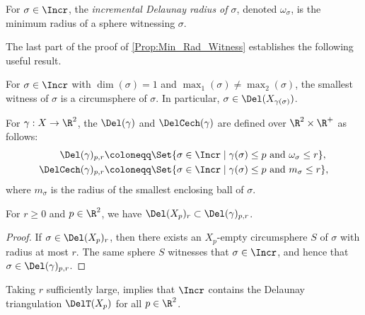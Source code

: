 %
\begin{definition}
For $\sigma\in \Incr$, the \emph{incremental Delaunay radius of $\sigma$},  denoted $\omega_\sigma$, is the minimum radius of a sphere witnessing $\sigma$. 
 \end{definition}
%
The last part of the proof of \cref{Prop:Min_Rad_Witness} establishes the following useful result.
%
\begin{proposition}\label{Prop:Empty_Tau_Delaunay}
For $\sigma\in \Incr$ with $\dim(\sigma)=1$ and $\max_1(\sigma)\ne \max_2(\sigma)$, the smallest witness of $\sigma$ is a circumsphere of $\sigma$.  In particular, $\sigma\in \Del(X_{\gamma(\sigma)})$.  
\end{proposition}
%
%
\begin{definition}
For $\gamma: X\to \R^2$, the  $\Del(\gamma)$ and  $\DelCech(\gamma)$ are defined over $\R^{2}\times\R^+$ as follows:
\begin{align*}
    \Del(\gamma)_{p, r} & \coloneqq \Set{\sigma\in\Incr \mid  \gamma(\sigma)\leq p\text{ and }  \omega_\sigma \leq r}, \\
    \DelCech(\gamma)_{p, r} & \coloneqq \Set{\sigma\in\Incr  \mid  \gamma(\sigma)\leq p\text{ and }  m_\sigma \leq r },
\end{align*}
where $m_\sigma$ is the radius of the smallest enclosing ball of $\sigma$.
\end{definition}
%
\begin{proposition}\label{prop:contains3}
For $r \geq 0$ and $p\in \R^2$, we have $\Del(X_p)_r\subset \Del(\gamma)_{p, r}$.
\end{proposition}
\begin{proof}
If $\sigma\in \Del(X_p)_r$, then there exists
an $X_p$-empty circumsphere $S$ of $\sigma$ with radius at most $r$.
The same sphere $S$ witnesses that $\sigma\in \Incr$, and hence that $\sigma\in \Del(\gamma)_{p,r}$. 
\end{proof}
%
%
Taking $r$ sufficiently large,  implies that $\Incr$ contains the Delaunay triangulation $\DelT(X_p)$ for all $p\in \R^2$.
%
